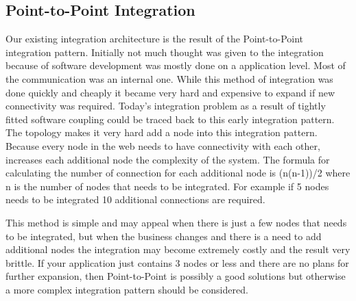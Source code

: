 \documentclass{llncs}
\begin{document}
\label{sec:background}

\subsection{Point-to-Point Integration}
Our existing integration architecture is the result of the Point-to-Point integration pattern. Initially not much thought was given to the integration because of software development was mostly done on a application level. Most of the communication was an internal one. While this method of integration was done quickly and cheaply it became very hard and expensive to expand if new connectivity was required. Today's integration problem as a result of tightly fitted software coupling could be traced back to this early integration pattern. The topology makes it very hard add a node into this integration pattern. Because every node in the web needs to have connectivity with each other, increases each additional node the complexity of the system. The  formula for calculating the number of connection for each additional node is (n(n-1))/2 where n is the number of nodes that needs to be integrated. For example if 5 nodes needs to be integrated 10 additional connections are required.

This method is simple and may appeal when there is just a few nodes that needs to be integrated, but when the business changes and there is a need to add additional nodes the integration may become extremely costly and the result very brittle. If your application just contains 3 nodes or less and there are no plans for further expansion, then Point-to-Point is possibly a good solutions but otherwise a more complex integration pattern should be considered.
\end{document}
